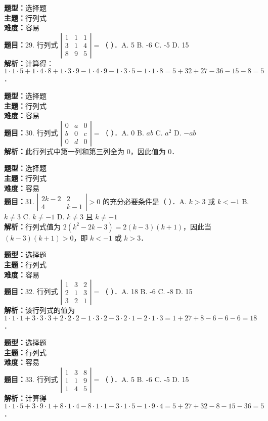 \documentclass{ctexart}
\newenvironment{question}[5]{%
	\noindent\textbf{题型：}#1\\
	\textbf{主题：}#2\\
	\textbf{难度：}#3\\
	\textbf{题目：}#4\\
	\textbf{解析：}#5\\
	\vspace{1em}
}{}
\begin{document}
\begin{question}
	{选择题}
	{行列式}
	{容易}
	{29. 行列式 $\left|\begin{array}{ccc}1 & 1 & 1 \\ 3 & 1 & 4 \\ 8 & 9 & 5\end{array}\right|=$（ ）．A. 5 B. -6 C. -5 D. 15}
	{计算得：$1 \cdot 1 \cdot 5 + 1 \cdot 4 \cdot 8 + 1 \cdot 3 \cdot 9 - 1 \cdot 4 \cdot 9 - 1 \cdot 3 \cdot 5 - 1 \cdot 1 \cdot 8 = 5 + 32 + 27 - 36 - 15 - 8 = 5$．}
\end{question}

\begin{question}
	{选择题}
	{行列式}
	{容易}
	{30. 行列式 $\left|\begin{array}{ccc}0 & a & 0 \\ b & 0 & c \\ 0 & d & 0\end{array}\right|=$（ ）．A. 0 B. $ab$ C. $a^2$ D. $-ab$}
	{此行列式中第一列和第三列全为 0，因此值为 0．}
\end{question}

\begin{question}
	{选择题}
	{行列式}
	{容易}
	{31. $\left|\begin{array}{cc}2k - 2 & 2 \\ 4 & k - 1\end{array}\right| > 0$ 的充分必要条件是（ ）．A. $k > 3$ 或 $k < -1$ B. $k \neq 3$ C. $k \neq -1$ D. $k \neq 3$ 且 $k \neq -1$}
	{行列式值为 $2(k^2 - 2k - 3) = 2(k - 3)(k + 1)$，因此当 $(k - 3)(k + 1) > 0$，即 $k < -1$ 或 $k > 3$．}
\end{question}

\begin{question}
	{选择题}
	{行列式}
	{容易}
	{32. 行列式 $\left|\begin{array}{ccc}1 & 3 & 2 \\ 2 & 1 & 3 \\ 3 & 2 & 1\end{array}\right|=$（ ）．A. 18 B. -6 C. -8 D. 15}
	{该行列式的值为 $1 \cdot 1 \cdot 1 + 3 \cdot 3 \cdot 3 + 2 \cdot 2 \cdot 2 - 1 \cdot 3 \cdot 2 - 3 \cdot 2 \cdot 1 - 2 \cdot 1 \cdot 3 = 1 + 27 + 8 - 6 - 6 - 6 = 18$．}
\end{question}

\begin{question}
	{选择题}
	{行列式}
	{容易}
	{33. 行列式 $\left|\begin{array}{ccc}1 & 3 & 8 \\ 1 & 1 & 9 \\ 1 & 4 & 5\end{array}\right|=$（ ）．A. 5 B. -6 C. -5 D. 15}
	{计算得 $1 \cdot 1 \cdot 5 + 3 \cdot 9 \cdot 1 + 8 \cdot 1 \cdot 4 - 8 \cdot 1 \cdot 1 - 3 \cdot 1 \cdot 5 - 1 \cdot 9 \cdot 4 = 5 + 27 + 32 - 8 - 15 - 36 = 5$．}
\end{question}
\end{document}
